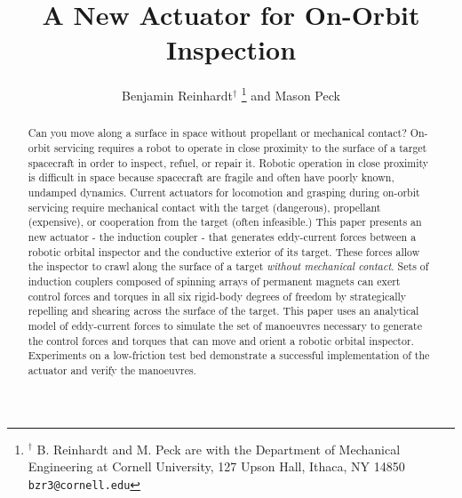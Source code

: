 \documentclass[letterpaper, 10 pt, conference]{ieeeconf}  %
\title{\LARGE \bf
A New Actuator for On-Orbit Inspection 
}
\author{Benjamin Reinhardt$^{\dag}$ 
\thanks{$^{\dag}$ B. Reinhardt and M. Peck are with the Department of Mechanical Engineering at Cornell University, 127 Upson Hall, Ithaca, NY 14850 {\tt\small bzr3@cornell.edu}}%
and Mason Peck%
}
\begin{document}
\maketitle
\thispagestyle{empty}
\pagestyle{empty}


\begin{abstract}

Can you move along a surface in space without propellant or mechanical contact? On-orbit servicing requires a robot to operate in close proximity to the surface of a target spacecraft in order to inspect, refuel, or repair it.  Robotic operation in close proximity is difficult in space because spacecraft are fragile and often have poorly known, undamped dynamics. Current actuators for locomotion and grasping during on-orbit servicing require mechanical contact with the target (dangerous), propellant (expensive), or cooperation from the target (often infeasible.)   
%
This paper presents an new actuator - the induction coupler - that generates eddy-current forces between a robotic orbital inspector and the conductive exterior of its target. These forces allow the inspector to crawl along the surface of a target \textit{without mechanical contact}. Sets of induction couplers composed of spinning arrays of permanent magnets can exert control forces and torques in all six rigid-body degrees of freedom by strategically repelling and shearing across the surface of the target. 
%
This paper uses an analytical model of eddy-current forces to simulate the set of manoeuvres necessary to generate the control forces and torques that can move and orient a robotic orbital inspector. Experiments on a low-friction test bed demonstrate a successful implementation of the actuator and verify the manoeuvres.

\end{abstract}


\listoftodos
\end{document}
